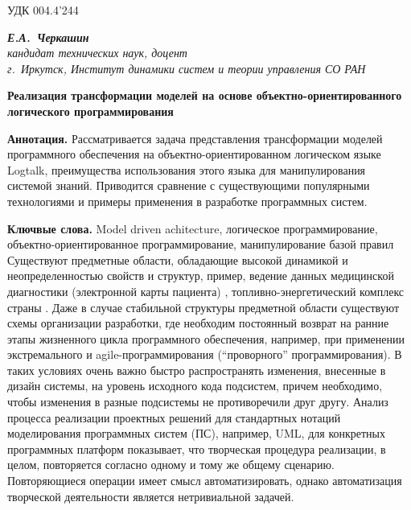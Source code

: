 \documentclass[12pt]{article}
\begin{document}
УДК 004.4'244
\begin{flushright}\itshape{}
  \textbf{Е.А.~Черкашин}\\
  кандидат технических наук, доцент\\
  г.~Иркутск, Институт динамики систем и теории управления СО РАН
\end{flushright}
\begin{center}
  \Large\bfseries Реализация трансформации моделей на основе объектно-ориентированного логического программирования
\end{center}

\textbf{Аннотация.} Рассматривается задача представления трансформации моделей программного обеспечения на объектно-ориентированном логическом языке Logtalk, преимущества использования этого языка для манипулирования системой знаний.  Приводится сравнение с существующими популярными технологиями и примеры применения в разработке программных систем.

\textbf{Ключвые слова.} Model driven achitecture, логическое программирование, объектно-ориентированное программирование, манипулирование базой правил\\

Существуют предметные области, обладающие высокой динамикой и неопределенностью свойств и структур, пример, ведение данных медицинской диагностики (электронной карты пациента) \cite{paramonov}, топливно-энергетический комплекс страны \cite{docdiss}.  Даже в случае стабильной структуры предметной области существуют схемы организации разработки, где необходим постоянный возврат на ранние этапы жизненного цикла программного обеспечения, например, при применении экстремального и agile-программирования (``проворного'' программирования).  В таких условиях очень важно быстро распространять изменения, внесенные в дизайн системы, на уровень исходного кода подсистем, причем необходимо, чтобы изменения в разные подсистемы не противоречили друг другу.  Анализ процесса реализации проектных решений для стандартных нотаций моделирования программных систем (ПС), например, UML, для конкретных программных платформ показывает, что творческая процедура реализации, в целом, повторяется согласно одному и тому же общему сценарию.  Повторяющиеся операции имеет смысл автоматизировать, однако автоматизация творческой деятельности является нетривиальной задачей.
\end{document}
